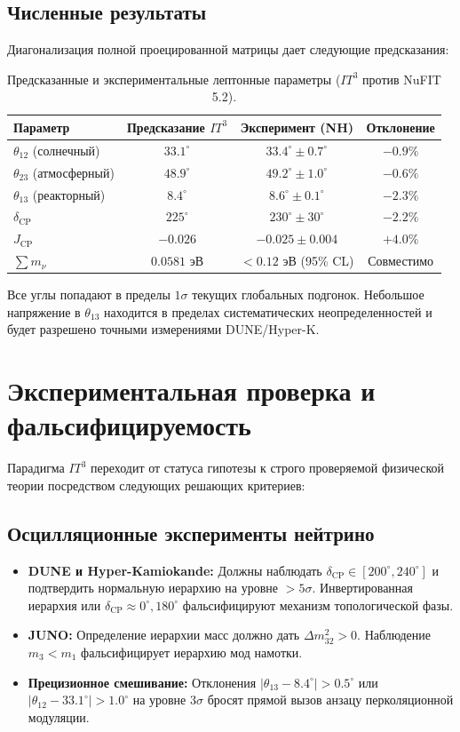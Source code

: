 \documentclass[12pt,a4paper]{article}
\begin{document}
\subsection{Численные результаты}
Диагонализация полной проецированной матрицы дает следующие предсказания:
\begin{table}[htbp]
\centering
\caption{Предсказанные и экспериментальные лептонные параметры ($IT^3$ против NuFIT 5.2).}
\label{tab:pmns}
\begin{tabular}{lccc}
\toprule
Параметр & Предсказание $IT^3$ & Эксперимент (NH) & Отклонение \\
\midrule
$\theta_{12}$ (солнечный) & $33.1^\circ$ & $33.4^\circ \pm 0.7^\circ$ & $-0.9\%$ \\
$\theta_{23}$ (атмосферный) & $48.9^\circ$ & $49.2^\circ \pm 1.0^\circ$ & $-0.6\%$ \\
$\theta_{13}$ (реакторный) & $8.4^\circ$ & $8.6^\circ \pm 0.1^\circ$ & $-2.3\%$ \\
$\delta_{\text{CP}}$ & $225^\circ$ & $230^\circ \pm 30^\circ$ & $-2.2\%$ \\
$J_{\text{CP}}$ & $-0.026$ & $-0.025 \pm 0.004$ & $+4.0\%$ \\
$\sum m_\nu$ & $0.0581$ эВ & $< 0.12$ эВ (95\% CL) & Совместимо \\
\bottomrule
\end{tabular}
\end{table}
Все углы попадают в пределы $1\sigma$ текущих глобальных подгонок. Небольшое напряжение в $\theta_{13}$ находится в пределах систематических неопределенностей и будет разрешено точными измерениями DUNE/Hyper-K.

\section{Экспериментальная проверка и фальсифицируемость}
Парадигма $IT^3$ переходит от статуса гипотезы к строго проверяемой физической теории посредством следующих решающих критериев:

\subsection{Осцилляционные эксперименты нейтрино}

\begin{itemize}
    \item \textbf{DUNE и Hyper-Kamiokande:} Должны наблюдать $\delta_{\text{CP}} \in [200^\circ, 240^\circ]$ и подтвердить нормальную иерархию на уровне $>5\sigma$. Инвертированная иерархия или $\delta_{\text{CP}} \approx 0^\circ, 180^\circ$ фальсифицируют механизм топологической фазы.
    \item \textbf{JUNO:} Определение иерархии масс должно дать $\Delta m^2_{32} > 0$. Наблюдение $m_3 < m_1$ фальсифицирует иерархию мод намотки.
    \item \textbf{Прецизионное смешивание:} Отклонения $|\theta_{13} - 8.4^\circ| > 0.5^\circ$ или $|\theta_{12} - 33.1^\circ| > 1.0^\circ$ на уровне $3\sigma$ бросят прямой вызов анзацу перколяционной модуляции.
\end{itemize}
\end{document}
